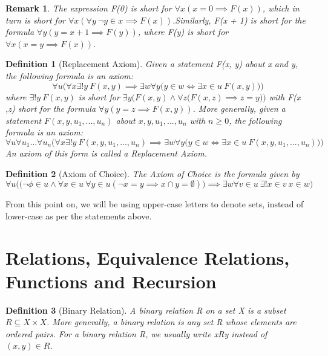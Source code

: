 \documentclass[11pt, oneside]{book}
\theoremstyle{break}
\newtheorem*{remark}{Remark}
\newtheorem{defn}{Definition}[section]
\begin{document}
\begin{remark}
	The expression F(0) is short for $\forall x (x = 0 \implies F(x))$, which in turn is short for $\forall x (\forall y \> \neg y \in x \implies F(x))$.Similarly, F(x + 1) is short for the formula $\forall y (y = x + 1 \implies F(y))$, where F(y) is short for $\forall x (x = y \implies F(x))$.
\end{remark}

\begin{defn}[Replacement Axiom]
	Given a statement F(x, y) about x and y, the following formula is an axiom:
	\[
		\forall u \Big( \forall x \exists! y \> F(x,y) \implies \exists w \forall y \big( y \in w \iff \exists x \in u \> F(x, y) \big) \Big)
	\]
	where $\exists! y \> F(x, y)$ is short for $\exists y \Big(F(x, y) \land \forall z \big(F(x, z) \implies z = y)\Big)$ with F(x ,z) short for the formula $\forall y (y = z \implies F(x, y))$. More generally, given a statement $F(x, y, u_1, ..., u_n)$ about $x, y, u_1, ..., u_n$ with $n \geq 0$, the following formula is an axiom:
	\[
		\forall u \forall u_1 \hdots \forall u_n \Big( \forall x \exists!y \> F(x, y, u_1, ..., u_n) \implies \exists w \forall y \big( y \in w \iff \exists x \in u \> F(x, y, u_1, ..., u_n) \big) \Big)
	\]
	An axiom of this form is called a Replacement Axiom.
\end{defn}

\begin{defn}[Axiom of Choice]
	The Axiom of Choice is the formula given by
	\[
		\forall u \Big( \big( \neg \phi \in u \land \forall x \in u \> \forall y \in u (\neg x = y \implies x \cap y = \emptyset) \big) \implies \exists w \forall v \in u \> \exists!x \in v \> x \in w \Big)
	\]
\end{defn}

From this point on, we will be using upper-case letters to denote sets, instead of lower-case as per the statements above.


\section{Relations, Equivalence Relations, Functions and Recursion}

\begin{defn}[Binary Relation]
	A binary relation R on a set X is a subset $R \subseteq X \times X$. More generally, a binary relation is any set R whose elements are ordered pairs. For a binary relation R, we usually write xRy instead of $(x, y) \in R$.
\end{defn}
\end{document}

